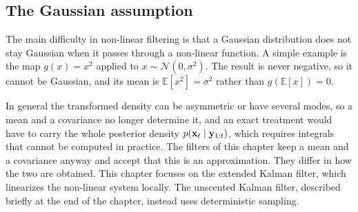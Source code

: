 \subsection*{The Gaussian assumption}
The main difficulty in non-linear filtering is that a Gaussian distribution does not stay Gaussian when it passes through a non-linear function. A simple example is the map $g(x) = x^2$ applied to $x \sim \mathcal{N}(0, \sigma^2)$. The result is never negative, so it cannot be Gaussian, and its mean is $\mathbb{E}[x^2] = \sigma^2$ rather than $g(\mathbb{E}[x]) = 0$. 

In general the transformed density can be asymmetric or have several modes, so a mean and a covariance no longer determine it, and an exact treatment would have to carry the whole posterior density $p(\mathbf{x}_t \mid \mathbf{y}_{1:t})$, which requires integrals that cannot be computed in practice. The filters of this chapter keep a mean and a covariance anyway and accept that this is an approximation. They differ in how the two are obtained. This chapter focuses on the extended Kalman filter, which linearizes the non-linear system locally. The unscented Kalman filter, described briefly at the end of the chapter, instead uses deterministic sampling.




